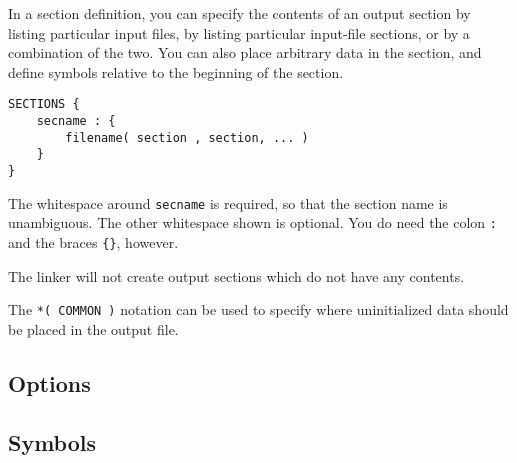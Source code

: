 In a section definition, you can specify the contents of an output section by listing particular input files, by listing particular input-file sections, or by a combination of the two. You can also place arbitrary data in the section, and define symbols relative to the beginning of the section.\cite{gnuldOutputSections}
\begin{verbatim}
SECTIONS {
    secname : {
        filename( section , section, ... )
    }
}
\end{verbatim}
The whitespace around \lstinline|secname| is required, so that the section name is unambiguous. The other whitespace shown is optional. You do need the colon \lstinline|:| and the braces \lstinline|{}|, however.\cite{gnuldOutputSections}

The linker will not create output sections which do not have any contents.\cite{gnuldOutputSections}

The \lstinline|*( COMMON )| notation can be used to specify where uninitialized data should be placed in the output file.\cite{gnuldOutputSections}

\subsection{Options}

\subsection{Symbols}